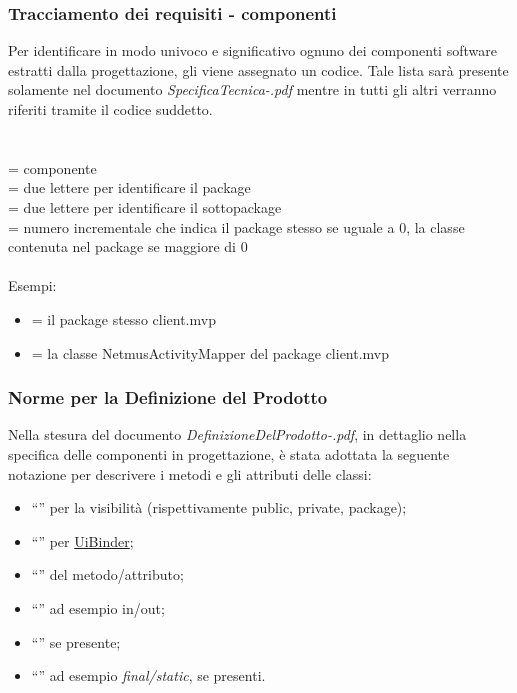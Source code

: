 \subsubsection{Tracciamento dei requisiti - componenti}
Per identificare in modo univoco e significativo ognuno dei componenti software
estratti dalla progettazione, gli viene assegnato un codice.
Tale lista sar\`a presente solamente nel documento
\emph{SpecificaTecnica-\versioneST.pdf} mentre in tutti gli altri verranno
riferiti tramite il codice suddetto.
\\
\\
\\
 = componente\\
 = due lettere per identificare il package\\
 = due lettere per identificare il sottopackage\\
 = numero incrementale che indica il package stesso se uguale a 0, la
classe contenuta nel package se maggiore di 0\\ \\
Esempi:
\begin{itemize}
  \item {} = il package stesso client.mvp
  \item {} = la classe NetmusActivityMapper del package client.mvp
\end{itemize}

\subsubsection{Norme per la Definizione del Prodotto}
Nella stesura del documento \emph{DefinizioneDelProdotto-\versioneDP.pdf}, in
dettaglio nella specifica delle componenti in progettazione, \`e stata adottata
la seguente notazione per descrivere i metodi e gli attributi delle classi:
\begin{itemize}
  \item ``\bo{+, -, \#}'' per la visibilit\`a (rispettivamente public, private,
  package);
  \item ``'' per \underline{UiBinder};
  \item ``'' del metodo/attributo;
  \item ``'' ad esempio in/out;
  \item ``'' se presente;
  \item ``'' ad esempio \emph{final/static}, se presenti.
\end{itemize}


